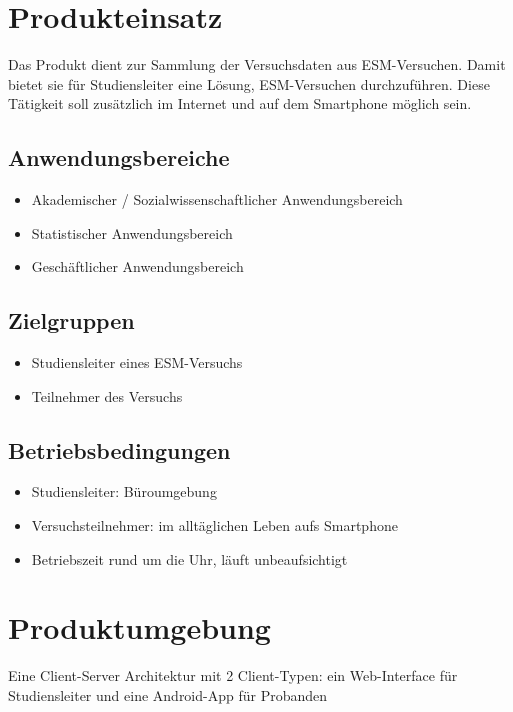 \documentclass[a4paper]{scrreprt}
\begin{document}
    \chapter{Produkteinsatz}
        Das Produkt dient zur Sammlung der Versuchsdaten aus ESM-Versuchen. Damit bietet sie für \gls{Studiensleiter} eine Lösung, ESM-Versuchen durchzuführen. Diese Tätigkeit soll zusätzlich im Internet und auf dem Smartphone möglich sein.

        \section{Anwendungsbereiche}
            \begin{itemize}
                \item Akademischer / Sozialwissenschaftlicher Anwendungsbereich
                \item Statistischer Anwendungsbereich
                \item Geschäftlicher Anwendungsbereich
            \end{itemize}

        \section{Zielgruppen}
            \begin{itemize}
                \item \gls{Studiensleiter} eines ESM-Versuchs
                \item Teilnehmer des Versuchs
            \end{itemize}

        \section{Betriebsbedingungen}
            \begin{itemize}
                \item \gls{Studiensleiter}: Büroumgebung
                \item Versuchsteilnehmer: im alltäglichen Leben aufs Smartphone
                \item Betriebszeit rund um die Uhr, läuft unbeaufsichtigt
            \end{itemize}

    \chapter{Produktumgebung}
        Eine Client-Server Architektur mit 2 Client-Typen: ein \gls{Web-Interface} für \gls{Studiensleiter} und eine \gls{Android-App} für \gls{Proband}en
\end{document}
